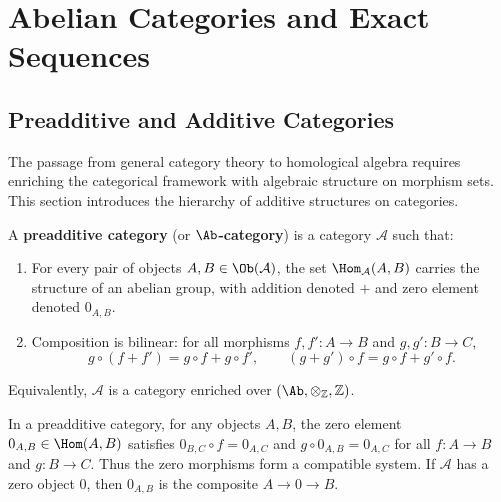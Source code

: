 
\chapter{Abelian Categories and Exact Sequences}\label{ch:abelian}
\minitoc

\section{Preadditive and Additive Categories}\label{sec:preadditive}

The passage from general category theory to homological algebra requires
enriching the categorical framework with algebraic structure on morphism sets.
This section introduces the hierarchy of additive structures on categories.

\begin{definition}\label{def:preadditive-cat}
A \textbf{preadditive category} (or \textbf{$\Ab$-category}) is a category $\mathcal{A}$
such that:
\begin{enumerate}
    \item For every pair of objects $A, B \in \Ob(\mathcal{A})$, the set $\Hom_{\mathcal{A}}(A,B)$
    carries the structure of an abelian group, with addition denoted $+$ and zero element
    denoted $0_{A,B}$.
    \item Composition is bilinear: for all morphisms $f, f' \colon A \to B$ and
    $g, g' \colon B \to C$,
    \[
        g \circ (f + f') = g \circ f + g \circ f', \qquad
        (g + g') \circ f = g \circ f + g' \circ f.
    \]
\end{enumerate}
Equivalently, $\mathcal{A}$ is a category enriched over $(\Ab, \otimes_{\mathbb{Z}}, \mathbb{Z})$.
\end{definition}

\begin{remark}\label{rem:preadditive-zero}
In a preadditive category, for any objects $A, B$, the zero element $0_{A,B} \in \Hom(A,B)$
satisfies $0_{B,C} \circ f = 0_{A,C}$ and $g \circ 0_{A,B} = 0_{A,C}$ for all
$f \colon A \to B$ and $g \colon B \to C$. Thus the zero morphisms form a compatible system.
If $\mathcal{A}$ has a zero object $0$, then $0_{A,B}$ is the composite $A \to 0 \to B$.
\end{remark}

